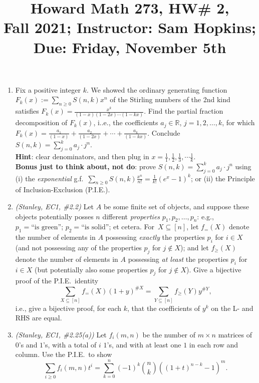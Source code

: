 \documentclass[11pt]{article}
\title{Howard Math 273, HW\# 2, \\ {\normalsize Fall 2021; Instructor: Sam Hopkins; Due: Friday, November 5th}}
\date{}
\begin{document}
\maketitle

\thispagestyle{empty}

\vspace{-1.8cm}

\begin{enumerate}

\item Fix a positive integer $k$. We showed the ordinary generating function $F_k(x) := \sum_{n\geq 0}S(n,k)x^n$ of the Stirling numbers of the 2nd kind satisfies $F_k(x) = \frac{x^k}{(1-x)(1-2x)\cdots(1-kx)}$. Find the partial fraction decomposition of $F_k(x)$, i..e., the coefficients $a_j \in \mathbb{R}$, $j=1,2,\ldots,k$, for which $F_k(x) = \frac{a_1}{(1-x)} + \frac{a_2}{(1-2x)} + \cdots + \frac{a_k}{(1-kx)}$. Conclude $S(n,k) = \sum_{j=0}^{k} a_j \cdot j^n$. \\
{\bf Hint}: clear denominators, and then plug in $x=\frac{1}{1}, \frac{1}{2}, \frac{1}{3}, \cdots \frac{1}{k}$. \\
{\bf Bonus just to think about, not do}: prove $S(n,k) = \sum_{j=0}^{k} a_j \cdot j^n$ using (i) the \emph{exponential} g.f.~$\sum_{n \geq 0} S(n,k) \frac{x^n}{n!} = \frac{1}{k!}(e^x-1)^k$; or (ii) the Principle of Inclusion-Exclusion (P.I.E.).

\item \emph{(Stanley, EC1, \#2.2)} Let $A$ be some finite set of objects, and suppose these objects potentially posses $n$ different \emph{properties} $p_1,p_2,\ldots,p_n$: e.g., $p_1=\textrm{``is green''}$; $p_2=\textrm{``is solid''}$; et cetera.  For~$X\subseteq [n]$, let $f_{=}(X)$ denote the number of elements in $A$ possessing \emph{exactly} the properties $p_i$ for $i\in X$ (and not possessing any of the properties $p_j$ for $j\notin X$); and let $f_{\geq}(X)$ denote the number of elements in $A$ possessing \emph{at least} the properties $p_i$ for $i\in X$ (but potentially also some properties $p_j$ for $j\notin X$). Give a bijective proof of the P.I.E.~identity
\[ \sum_{X\subseteq [n]} f_{=}(X) (1+y)^{\# X} = \sum_{Y\subseteq [n]} f_{\geq}(Y) y^{\#Y},\]
i.e., give a bijective proof, for each $k$, that the coefficients of $y^k$ on the L- and RHS are equal.

\item \emph{(Stanley, EC1, \#2.25(a))} Let $f_i(m,n)$ be the number of $m\times n$ matrices of $0$'s and $1$'s, with a total of $i$ $1$'s, and with at least one $1$ in each row and column. Use the P.I.E.~to show
\[ \sum_{i \geq 0} f_i(m,n) t^i = \sum_{k=0}^{n}(-1)^k\binom{n}{k}( (1+t)^{n-k}-1)^m.\]


\end{enumerate}
\end{document}
